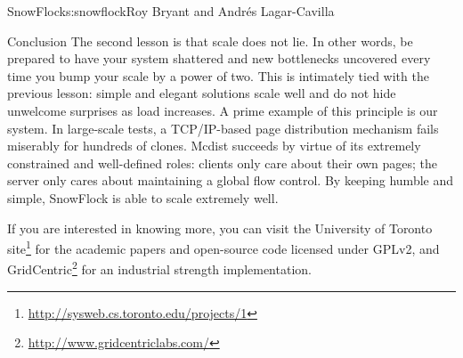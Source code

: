 \begin{aosachapter}{SnowFlock}{s:snowflock}{Roy Bryant and Andr\'e{s} Lagar-Cavilla}
\begin{aosasect1}{Conclusion}
The second lesson is that scale does not lie. In other words, be
prepared to have your system shattered and new bottlenecks uncovered
every time you bump your scale by a power of two. This is intimately
tied with the previous lesson: simple and elegant solutions scale well
and do not hide unwelcome surprises as load increases. A prime example
of this principle is our  system. In large-scale tests, a
TCP/IP-based page distribution mechanism fails miserably for hundreds
of clones. Mcdist succeeds by virtue of its extremely constrained and
well-defined roles: clients only care about their own pages; the
server only cares about maintaining a global flow control. By keeping
 humble and simple, SnowFlock is able to scale extremely well.

If you are interested in knowing more, you can visit the University of
Toronto site\footnote{\url{http://sysweb.cs.toronto.edu/projects/1}} for the
academic papers and open-source code licensed under GPLv2, and
GridCentric\footnote{\url{http://www.gridcentriclabs.com/}} for an industrial strength
implementation.

\end{aosasect1}

\end{aosachapter}

